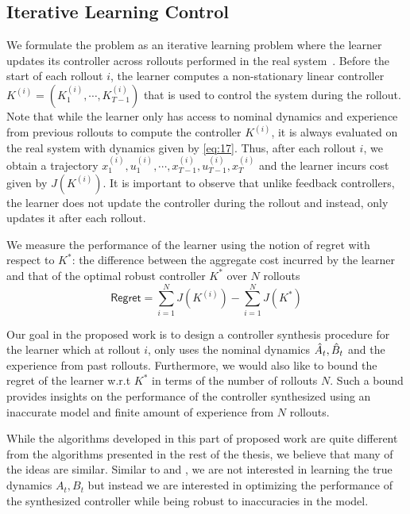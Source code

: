 \subsection{Iterative Learning Control}
\label{sec:iter-learn-contr}

We formulate the problem as an iterative learning problem where the
learner updates its controller across rollouts performed in the real
system~\cite{DBLP:journals/jfr/MooreDB92}. Before the start of
each rollout $i$, the learner computes a non-stationary linear
controller $K^{(i)} = (K_1^{(i)}, \cdots, K_{T-1}^{(i)})$ that is used
to control the system during the rollout. Note that while the learner
only has access to nominal dynamics and experience from previous
rollouts to compute the controller $K^{(i)}$, it is always evaluated
on the real system with dynamics given by \eqref{eq:17}. Thus, after
each rollout $i$, we obtain a trajectory $x_1^{(i)}, u_1^{(i)},
\cdots, x_{T-1}^{(i)}, u_{T-1}^{(i)}, x_T^{(i)}$ and the learner
incurs cost given by $J(K^{(i)})$. It is important to observe that
unlike feedback controllers, the learner does not update the
controller during the rollout and instead, only updates it after each
rollout. 

We measure the performance of the learner using the notion of regret
with respect to $K^*$: the difference between the aggregate cost
incurred by the learner and 
that of the optimal robust controller $K^*$ over $N$ rollouts
\begin{equation}
  \label{eq:20}
  \mathsf{Regret} = \sum_{i=1}^N J(K^{(i)}) - \sum_{i=1}^N J(K^*)
\end{equation}

Our goal in the proposed work is to design a controller synthesis
procedure for the learner which at rollout $i$, only uses the nominal
dynamics $\hat{A}_t, \hat{B}_t$ and the experience from past
rollouts. Furthermore, we would also like to bound the regret of the
learner w.r.t $K^*$ in terms of the number of rollouts $N$. Such a bound
provides insights on the performance of the controller synthesized
using an
inaccurate model and finite amount of
experience from $N$ rollouts.

While the algorithms developed in this part of proposed work are quite
different from the algorithms presented in the rest of the thesis, we
believe that many of the ideas are similar. Similar to \cmax{} and
\cmaxpp{}, we are not interested in learning the true dynamics $A_t,
B_t$ but instead we are interested in optimizing the performance of
the synthesized controller while being robust to inaccuracies in the model.


